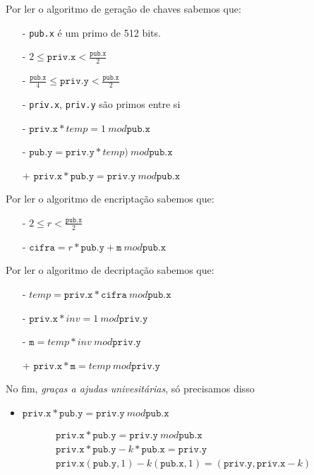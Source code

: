 \documentclass{article}
\begin{document}
Por ler o algoritmo de geração de chaves sabemos que:
\begin{itemize}
    \item[-] \texttt{pub.x} é um primo de 512 bits.
    \item[-] \( 2 \le \texttt{priv.x} < \frac{\texttt{pub.x}}{2} \)
    \item[-] \( \frac{\texttt{pub.x}}{4} \le \texttt{priv.y} < \frac{\texttt{pub.x}}{2} \)
    \item[-] \texttt{priv.x}, \texttt{priv.y} são primos entre si
    \item[-] \( \texttt{priv.x} * temp = 1 \ mod \texttt{pub.x} \)
    \item[-] \( \texttt{pub.y} = \texttt{priv.y} * temp) \ mod \texttt{pub.x} \)
    \item[+] \( \texttt{priv.x} * \texttt{pub.y} = \texttt{priv.y} \ mod \texttt{pub.x} \)
\end{itemize}

Por ler o algoritmo de encriptação sabemos que:
\begin{itemize}
    \item[-] \( 2 \le r < \frac{\texttt{pub.x}}{2} \)
    \item[-] \( \texttt{cifra} = r * \texttt{pub.y} + \texttt{m} \ mod \texttt{pub.x} \)
\end{itemize}

Por ler o algoritmo de decriptação sabemos que:
\begin{itemize}
    \item[-] \( temp = \texttt{priv.x} * \texttt{cifra} \ mod \texttt{pub.x} \)
    \item[-] \( \texttt{priv.x} * inv = 1 \ mod \texttt{priv.y} \)
    \item[-] \( \texttt{m} = temp * inv \ mod \texttt{priv.y} \)
    \item[+] \( \texttt{priv.x} * \texttt{m} = temp \ mod \texttt{priv.y} \)
\end{itemize}

No fim, \emph{graças a ajudas univesitárias},
só precisamos disso
\begin{itemize}
    \item \( \texttt{priv.x} * \texttt{pub.y} = \texttt{priv.y} \ mod \texttt{pub.x} \)
\end{itemize}
\begin{gather*}
    \texttt{priv.x} * \texttt{pub.y} = \texttt{priv.y} \ mod \texttt{pub.x} \\
    \texttt{priv.x} * \texttt{pub.y} - k * \texttt{pub.x} = \texttt{priv.y} \\
    \texttt{priv.x} (\texttt{pub.y}, 1) -  k (\texttt{pub.x}, 1) =
        (\texttt{priv.y}, \texttt{priv.x} - k)
\end{gather*}
\end{document}
